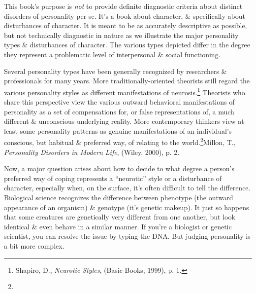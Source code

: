 \documentclass{article}
\numberwithin{equation}{section}
\begin{document}
This book's purpose is \textit{not} to provide definite diagnostic criteria about distinct disorders of personality per se. It's a book about character, \& specifically about disturbances of character. It is meant to be as accurately descriptive as possible, but not technically diagnostic in nature as we illustrate the major personality types \& disturbances of character. The various types depicted differ in the degree they represent a problematic level of interpersonal \& social functioning.

Several personality types have been generally recognized by researchers \& professionals for many years. More traditionally-oriented theorists still regard the various personality styles as different manifestations of neurosis.\footnote{Shapiro, D., \textit{Neurotic Styles}, (Basic Books, 1999), p. 1.} Theorists who share this perspective view the various outward behavioral manifestations of personality as a set of compensations for, or false representations of, a much different \& unconscious underlying reality. More contemporary thinkers view at least some personality patterns as genuine manifestations of an individual's conscious, but habitual \& preferred way, of relating to the world.\footnote{}Millon, T., \textit{Personality Disorders in Modern Life}, (Wiley, 2000), p. 2.

Now, a major question arises about how to decide to what degree a person's preferred way of coping represents a ``neurotic'' style or a disturbance of character, especially when, on the surface, it's often difficult to tell the difference. Biological science recognizes the difference between phenotype (the outward appearance of an organism) \& genotype (it's genetic makeup). It just so happens that some creatures are genetically very different from one another, but look identical \& even behave in a similar manner. If you're a biologist or genetic scientist, you can resolve the issue by typing the DNA. But judging personality is a bit more complex.
\end{document}
